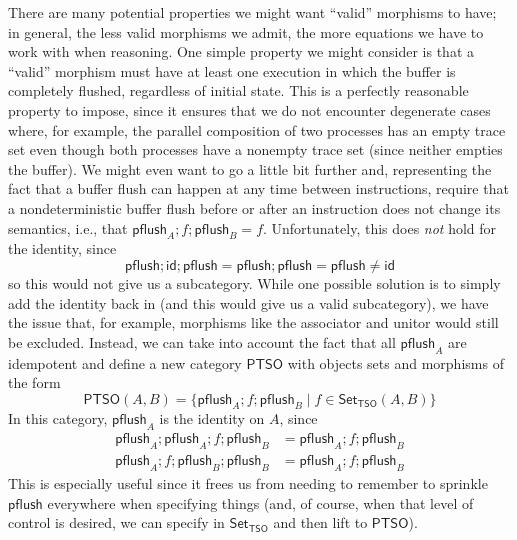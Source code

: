 \documentclass[acmsmall,screen,review]{acmart}
\newcommand{\ms}[1]{\ensuremath{\mathsf{#1}}}
\begin{document}
There are many potential properties we might want ``valid'' morphisms to have; in general, the less
valid morphisms we admit, the more equations we have to work with when reasoning. One simple
property we might consider is that a ``valid'' morphism must have at least one execution in which
the buffer is completely flushed, regardless of initial state. This is a perfectly reasonable
property to impose, since it ensures that we do not encounter degenerate cases where, for example,
the parallel composition of two processes has an empty trace  set even though both processes have a
nonempty trace set (since neither empties the buffer). We might even want to go a little bit further
and, representing the fact that a buffer flush can happen at any time between instructions, require
that a nondeterministic buffer flush before or after an instruction does not change its semantics,
i.e., that $\ms{pflush}_A ; f ; \ms{pflush}_B = f$. Unfortunately, this does \emph{not} hold for
the identity, since
\begin{equation}
  \ms{pflush} ; \ms{id} ; \ms{pflush} = \ms{pflush} ; \ms{pflush} = \ms{pflush} \neq \ms{id}
\end{equation}
so this would not give us a subcategory. While one possible solution is to simply add the identity
back in (and this would give us a valid subcategory), we have the issue that, for example, morphisms
like the associator and unitor would still be excluded. Instead, we can take into account the fact
that all $\ms{pflush}_A$ are idempotent and define a new category $\ms{PTSO}$ with objects sets and
morphisms of the form
\begin{equation}
  \ms{PTSO}(A, B) = \{\ms{pflush}_A; f; \ms{pflush}_B \mid f \in \ms{Set}_{\ms{TSO}}(A, B)\} 
\end{equation}
In this category, $\ms{pflush}_A$ is the identity on $A$, since
\begin{equation}
  \begin{aligned}
    \ms{pflush}_A ; \ms{pflush}_A; f; \ms{pflush}_B &= \ms{pflush}_A; f; \ms{pflush}_B \\
    \ms{pflush}_A; f; \ms{pflush}_B; \ms{pflush}_B &= \ms{pflush}_A; f; \ms{pflush}_B
  \end{aligned}
\end{equation}
This is especially useful since it frees us from needing to remember to sprinkle $\ms{pflush}$
everywhere when specifying things (and, of course, when that level of control is desired, we can
specify in $\ms{Set}_{\ms{TSO}}$ and then lift to $\ms{PTSO}$).
\end{document}
